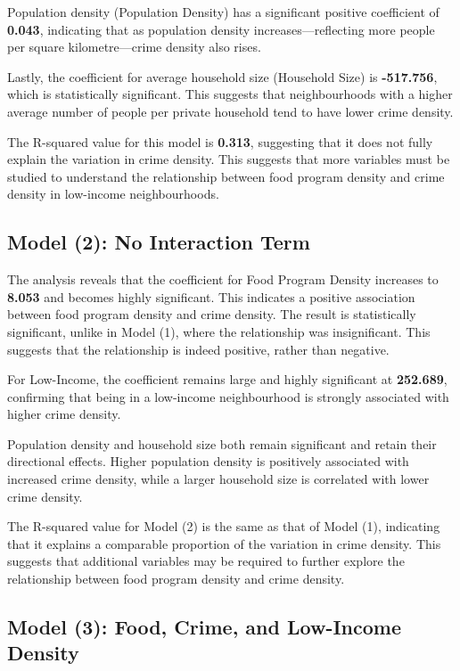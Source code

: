 \documentclass[AEJ]{AEA}
\begin{document}
Population density (Population Density) has a significant positive coefficient of \textbf{0.043}, indicating that as population density increases—reflecting more people per square kilometre—crime density also rises.

Lastly, the coefficient for average household size (Household Size) is \textbf{-517.756}, which is statistically significant. This suggests that neighbourhoods with a higher average number of people per private household tend to have lower crime density.

The R-squared value for this model is \textbf{0.313}, suggesting that it does not fully explain the variation in crime density. This suggests that more variables must be studied to understand the relationship between food program density and crime density in low-income neighbourhoods.

\subsection{Model (2): No Interaction Term}

The analysis reveals that the coefficient for Food Program Density increases to \textbf{8.053} and becomes highly significant. This indicates a positive association between food program density and crime density. The result is statistically significant, unlike in Model (1), where the relationship was insignificant. This suggests that the relationship is indeed positive, rather than negative.

For Low-Income, the coefficient remains large and highly significant at \textbf{252.689}, confirming that being in a low-income neighbourhood is strongly associated with higher crime density.

Population density and household size both remain significant and retain their directional effects. Higher population density is positively associated with increased crime density, while a larger household size is correlated with lower crime density.

The R-squared value for Model (2) is the same as that of Model (1), indicating that it explains a comparable proportion of the variation in crime density. This suggests that additional variables may be required to further explore the relationship between food program density and crime density.

\subsection{Model (3): Food, Crime, and Low-Income Density}
\end{document}
